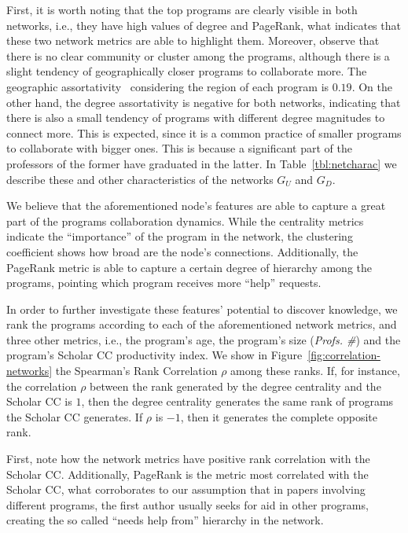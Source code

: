\documentclass[10pt]{article}
\begin{document}
First, it is worth noting that the top programs are clearly visible in both networks,
i.e., they have high values of degree and PageRank, what indicates that these two network
metrics are able to highlight them. Moreover, observe that there is no clear community or
cluster among the programs, although there is a slight tendency of geographically closer
programs to collaborate more. The geographic assortativity~\cite{Newman2003a} considering
the region of each program is $0.19$. On the other hand, the degree assortativity is
negative for both networks, indicating that there is also a small tendency of programs
with different degree magnitudes to connect more.  This is expected, since it is a common
practice of smaller programs to collaborate with bigger ones. This is because a significant part of
the professors of the former have graduated in the latter. In Table~\ref{tbl:netcharac} we
describe these and other characteristics of the networks $G_U$ and $G_D$.




We believe that the aforementioned node's features are able to capture a great part of the
programs collaboration dynamics. While the centrality metrics indicate the ``importance''
of the program in the network, the clustering coefficient shows how broad are the node's
connections. Additionally, the PageRank metric is able to capture a certain degree of
hierarchy among the programs, pointing which program receives more ``help'' requests. 

In order to further investigate these features' potential to discover knowledge, we rank the programs according to each of the aforementioned  network metrics, and three other metrics, i.e., the program's age, the program's size ({\em Profs. \#}) and the program's Scholar CC productivity index. We show in Figure~\ref{fig:correlation-networks} the Spearman's Rank Correlation $\rho$ among these ranks. If, for instance, the correlation $\rho$ between the rank generated by the degree centrality and the Scholar CC is $1$, then the degree centrality generates the same rank of programs the Scholar CC generates. If $\rho$ is $-1$, then it generates the complete opposite rank.

First, note how the network metrics have positive rank correlation with the Scholar CC.
Additionally, PageRank is the metric most correlated with the Scholar CC, what
corroborates to our assumption that in papers involving different programs, the first author
usually seeks for aid in other programs, creating the so called ``needs help
from''
hierarchy in the network.
\end{document}
